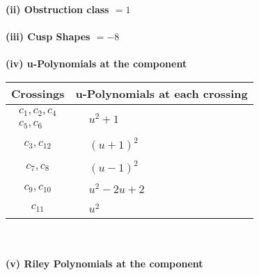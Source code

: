 \documentclass[1p]{elsarticle_modified}
\theoremstyle{definition}
\begin{document}
\flushleft \textbf{(ii) Obstruction class $= 1$}\\~\\
\flushleft \textbf{(iii) Cusp Shapes $= -8$}\\~\\
\newpage\renewcommand{\arraystretch}{1}
\flushleft \textbf{(iv) u-Polynomials at the component}\newline \\
\begin{tabular}{m{50pt}|m{274pt}}
Crossings & \hspace{64pt}u-Polynomials at each crossing \\
\hline $$\begin{aligned}c_{1},c_{2},c_{4}\\c_{5},c_{6}\end{aligned}$$&$\begin{aligned}
&u^2+1
\end{aligned}$\\
\hline $$\begin{aligned}c_{3},c_{12}\end{aligned}$$&$\begin{aligned}
&(u+1)^2
\end{aligned}$\\
\hline $$\begin{aligned}c_{7},c_{8}\end{aligned}$$&$\begin{aligned}
&(u-1)^2
\end{aligned}$\\
\hline $$\begin{aligned}c_{9},c_{10}\end{aligned}$$&$\begin{aligned}
&u^2-2 u+2
\end{aligned}$\\
\hline $$\begin{aligned}c_{11}\end{aligned}$$&$\begin{aligned}
&u^2
\end{aligned}$\\
\hline
\end{tabular}\\~\\
\newpage\renewcommand{\arraystretch}{1}
\flushleft \textbf{(v) Riley Polynomials at the component}\newline \\
\end{document}
